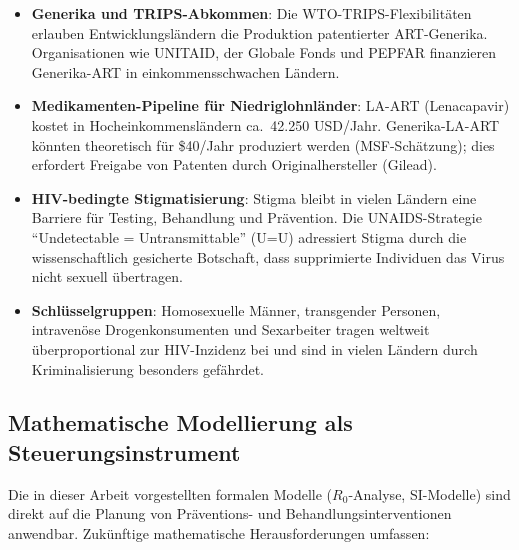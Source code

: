 ﻿\documentclass[a4paper,12pt]{article}
\theoremstyle{definition}
\begin{document}
\begin{itemize}
\item \textbf{Generika und TRIPS-Abkommen}: Die WTO-TRIPS-Flexibilit\"aten erlauben
      Entwicklungsl\"andern die Produktion patentierter ART-Generika. Organisationen
      wie UNITAID, der Globale Fonds und PEPFAR finanzieren Generika-ART in
      einkommensschwachen L\"andern.

\item \textbf{Medikamenten-Pipeline f\"ur Niedriglohnl\"ander}: LA-ART (Lenacapavir)
      kostet in Hocheinkommensländern ca.\ 42.250 USD/Jahr. Generika-LA-ART
      k\"onnten theoretisch f\"ur \$40/Jahr produziert werden (MSF-Sch\"atzung);
      dies erfordert Freigabe von Patenten durch Originalhersteller (Gilead).

\item \textbf{HIV-bedingte Stigmatisierung}: Stigma bleibt in vielen L\"andern
      eine Barriere f\"ur Testing, Behandlung und Pr\"avention.
      Die UNAIDS-Strategie ``Undetectable = Untransmittable'' (U=U) adressiert
      Stigma durch die wissenschaftlich gesicherte Botschaft, dass supprimierte
      Individuen das Virus nicht sexuell \"ubertragen.

\item \textbf{Schl\"usselgruppen}: Homosexuelle M\"anner, transgender Personen,
      intravenöse Drogenkonsumenten und Sexarbeiter tragen weltweit
      \"uberproportional zur HIV-Inzidenz bei und sind in vielen L\"andern
      durch Kriminalisierung besonders gef\"ahrdet.
\end{itemize}

\subsection{Mathematische Modellierung als Steuerungsinstrument}

Die in dieser Arbeit vorgestellten formalen Modelle ($R_0$-Analyse, SI-Modelle)
sind direkt auf die Planung von Pr\"aventions- und Behandlungsinterventionen
anwendbar. Zuk\"unftige mathematische Herausforderungen umfassen:
\end{document}

